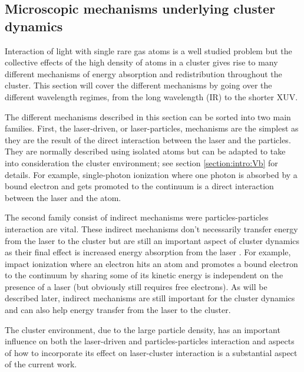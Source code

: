 

\subsection{Microscopic mechanisms underlying cluster dynamics}
\label{section:intro:mechanisms}

Interaction of light with single rare gas atoms is a well studied problem but
the collective effects of the high density of atoms in a cluster gives rise to
many different mechanisms of energy absorption and redistribution throughout the
cluster. This section will cover the different mechanisms by going over the
different wavelength regimes, from the long wavelength (IR) to the shorter XUV.

The different mechanisms described in this section can be sorted into two main
families. First, the laser-driven, or laser-particles, mechanisms are the
simplest as they are the result of the direct interaction between the laser
and the particles. They are normally described using isolated atoms but can
be adapted to take into consideration the cluster environment; see section
\ref{section:intro:Vb} for details. For example, single-photon ionization where
one photon is absorbed by a bound electron and gets promoted to the continuum is
a direct interaction between the laser and the atom.

The second family consist of indirect mechanisms were particles-particles
interaction are vital. These indirect mechanisms don't necessarily transfer
energy from the laser to the cluster but are still an important aspect of
cluster dynamics as their final effect is increased energy absorption from the
laser
%
%
. For example, impact ionization where
an electron hits an atom and promotes a bound electron to the continuum by
sharing some of its kinetic energy is independent on the presence of a laser
(but obviously still requires free electrons). As will be described later,
indirect mechanisms are still important for the cluster dynamics and can also
help energy transfer from the laser to the cluster.

The cluster environment, due to the large particle density, has an important
influence on both the laser-driven and particles-particles interaction and
%
aspects of how to incorporate its effect on laser-cluster interaction
%
is
a substantial aspect of the current work.

